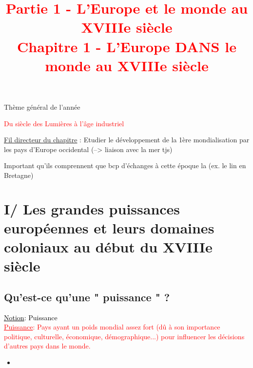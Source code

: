 \documentclass{beamer}
\date{}
\title{{\textcolor{red}{Partie 1 - L'Europe et le monde au XVIIIe siècle \\ Chapitre 1 - L'Europe DANS le monde au XVIIIe siècle}}}
\begin{document}
\newcommand{\df}[2]{\textcolor{red}{\underline{#1}: #2}}

\newcommand{\doc}[1]{
\begin{flushright}
\fbox{Documents : #1}
\end{flushright}
}

\newcommand{\con}[1]{\textcolor{blue}{\underline{Consigne}: #1}}

\newcommand{\rep}[1]{\textcolor{green}{\underline{Réponse}: #1}}

\newcommand{\ntn}[1]{\textcolor{black}{\underline{Notion}: #1}}

\begin{frame}{Thème général de l'année}
\begin{center}
{\Huge \textcolor{red}{Du siècle des Lumières à l'âge industriel}}
\end{center}
\end{frame}

\begin{frame}
 \titlepage %
 \end{frame}

\begin{frame}
\underline{Fil directeur du chapitre} : Etudier le développement de la 1ère mondialisation par les pays d'Europe occidental (--> liaison avec la mer tjs)
\end{frame}

\begin{frame}
Important qu'ils comprennent que bcp d'échanges à cette époque la (ex. le lin en Bretagne)
\end{frame}

\section{I/ Les grandes puissances européennes et leurs domaines coloniaux au début du XVIIIe siècle}

\subsection{Qu'est-ce qu'une " puissance " ?}

\begin{frame}{}

\ntn{Puissance} \\

\df{Puissance}{Pays ayant un poids mondial assez fort (dû à son importance politique, culturelle, économique, démographique...) pour influencer les décisions d'autres pays dans le monde.}

\begin{itemize}
\item 
\end{itemize}

\end{frame}
\end{document}
